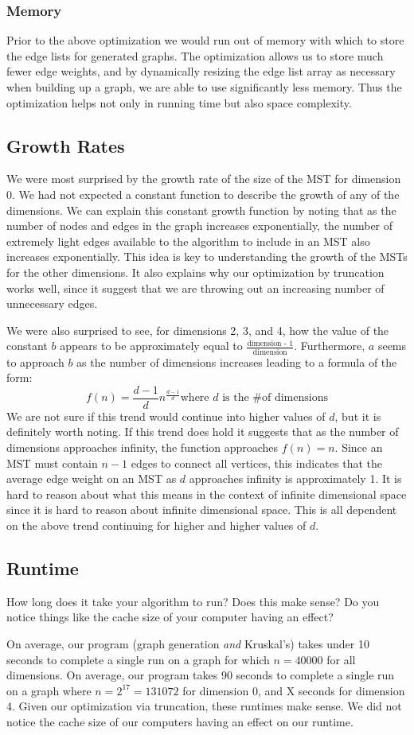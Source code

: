 \documentclass[solution, letterpaper]{cs121}
\begin{document}
\subsubsection*{Memory}
Prior to the above optimization we would run out of memory with which to store the edge lists for generated graphs. The optimization allows us to store much fewer edge weights, and by dynamically resizing the edge list array as necessary when building up a graph, we are able to use significantly less memory. Thus the optimization helps not only in running time but also space complexity.

\subsection*{Growth Rates}
We were most surprised by the growth rate of the size of the MST for dimension 0. We had not expected a constant function to describe the growth of any of the dimensions. We can explain this constant growth function by noting that as the number of nodes and edges in the graph increases exponentially, the number of extremely light edges available to the algorithm to include in an MST also increases exponentially. This idea is key to understanding the growth of the MSTs for the other dimensions. It also explains why our optimization by truncation works well, since it suggest that we are throwing out an increasing number of unnecessary edges.

We were also surprised to see, for dimensions 2, 3, and 4, how the value of the constant $b$ appears to be approximately equal to $\frac{\text{dimension - 1}}{\text{dimension}}$. Furthermore, $a$ seems to approach $b$ as the number of dimensions increases leading to a formula of the form:
\[
f(n) = \dfrac{d-1}{d}n^{\frac{d-1}{d}} \text{where $d$ is the \# of dimensions}
\]
We are not sure if this trend would continue into higher values of $d$, but it is definitely worth noting. If this trend does hold it suggests that as the number of dimensions approaches infinity, the function approaches $f(n) = n$. Since an MST must contain $n - 1$ edges to connect all vertices, this indicates that the average edge weight on an MST as $d$ approaches infinity is approximately 1. It is hard to reason about what this means in the context of infinite dimensional space since it is hard to reason about infinite dimensional space. This is all dependent on the above trend continuing for higher and higher values of $d$.
\subsection*{Runtime}
How long does it take your algorithm to run? Does this make sense? Do you notice things like the cache size of your computer having an effect?

On average, our program (graph generation \emph{and} Kruskal's) takes under 10 seconds to complete a single run on a graph for which $n = 40000$ for all dimensions. On average, our program takes 90 seconds to complete a single run on a graph where $n = 2^{17} = 131072$ for dimension 0, and X seconds for dimension 4. Given our optimization via truncation, these runtimes make sense. We did not notice the cache size of our computers having an effect on our runtime.
\end{document}

